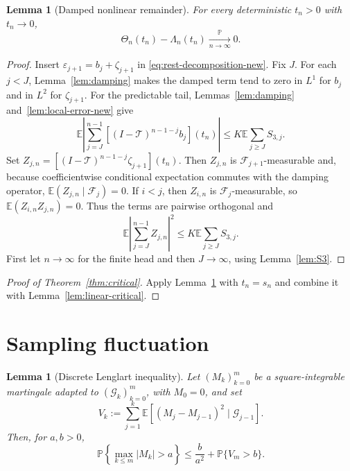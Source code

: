 \documentclass[journal]{IEEEtran}
\theoremstyle{plain}
\newtheorem{lemma}[theorem]{Lemma}
\theoremstyle{definition}
\theoremstyle{remark}
\newcommand{\F}{\mathcal F}
\newcommand{\Pideal}{\mathbb P}
\begin{document}
\begin{lemma}[Damped nonlinear remainder]\label{lem:nonlinear-remainder}
For every deterministic $t_n>0$ with $t_n\to0$,
\begin{equation}\label{eq:nonlinear-remainder}
 \Theta_n(t_n)-\Lambda_n(t_n)
 \xrightarrow[n\to\infty]{\Pideal}0.
\end{equation}
\end{lemma}

\begin{proof}
Insert $\varepsilon_{j+1}=b_j+\zeta_{j+1}$ in \eqref{eq:rest-decomposition-new}.  Fix $J$.  For each $j<J$, Lemma~\ref{lem:damping} makes the damped term tend to zero in $L^1$ for $b_j$ and in $L^2$ for $\zeta_{j+1}$.  For the predictable tail, Lemmas~\ref{lem:damping} and~\ref{lem:local-error-new} give
\begin{equation*}
 \mathbb E\left|
 \sum_{j=J}^{n-1}[(I-\mathcal T)^{n-1-j}b_j](t_n)
 \right|
 \le K\mathbb E\sum_{j\ge J}S_{3,j}.
\end{equation*}
Set $Z_{j,n}=[(I-\mathcal T)^{n-1-j}\zeta_{j+1}](t_n)$.  Then $Z_{j,n}$ is $\F_{j+1}$-measurable and, because coefficientwise conditional expectation commutes with the damping operator,
$\mathbb E(Z_{j,n}\mid\F_j)=0$.  If $i<j$, then $Z_{i,n}$ is $\F_j$-measurable, so $\mathbb E(Z_{i,n}Z_{j,n})=0$.  Thus the terms are pairwise orthogonal and
\begin{equation*}
 \mathbb E\left|
 \sum_{j=J}^{n-1}Z_{j,n}
 \right|^2
 \le K\mathbb E\sum_{j\ge J}S_{3,j}.
\end{equation*}
First let $n\to\infty$ for the finite head and then $J\to\infty$, using Lemma~\ref{lem:S3}.
\end{proof}

\begin{proof}[Proof of Theorem~\ref{thm:critical}]
Apply Lemma~\ref{lem:nonlinear-remainder} with $t_n=s_n$ and combine it with Lemma~\ref{lem:linear-critical}.
\end{proof}

\section{Sampling fluctuation}\label{app:sampling}

\begin{lemma}[Discrete Lenglart inequality]\label{lem:lenglart}
Let $(M_k)_{k=0}^m$ be a square-integrable martingale adapted to $(\mathcal G_k)_{k=0}^m$, with $M_0=0$, and set
\begin{equation*}
 V_k:=\sum_{j=1}^k
 \mathbb E[(M_j-M_{j-1})^2\mid\mathcal G_{j-1}].
\end{equation*}
Then, for $a,b>0$,
\begin{equation}\label{eq:lenglart}
 \mathbb P\left\{\max_{k\le m}|M_k|>a\right\}
 \le\frac b{a^2}+\mathbb P\{V_m>b\}.
\end{equation}
\end{lemma}
\end{document}
